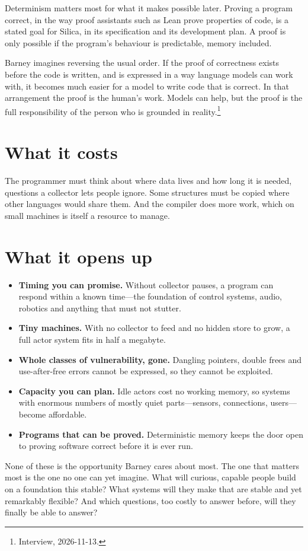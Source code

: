 Determinism matters most for what it makes possible later. Proving a program
correct, in the way proof assistants such as Lean prove properties of code, is
a stated goal for Silica, in its specification and its development plan. A
proof is only possible if the program's behaviour is predictable, memory
included.

Barney imagines reversing the usual order. If the proof of correctness exists
before the code is written, and is expressed in a way language models can work
with, it becomes much easier for a model to write code that is correct. In that
arrangement the proof is the human's work. Models can help, but the proof is the
full responsibility of the person who is grounded in
reality.\footnote{Interview, 2026-11-13.}


\section{What it costs}

The programmer must think about where data lives and how long it is needed,
questions a collector lets people ignore. Some structures must be copied where
other languages would share them. And the compiler does more work, which on
small machines is itself a resource to manage.

\section{What it opens up}

\begin{itemize}
  \item \textbf{Timing you can promise.} Without collector pauses, a program
        can respond within a known time---the foundation of control systems,
        audio, robotics and anything that must not stutter.
  \item \textbf{Tiny machines.} With no collector to feed and no hidden store
        to grow, a full actor system fits in half a megabyte.
  \item \textbf{Whole classes of vulnerability, gone.} Dangling pointers,
        double frees and use-after-free errors cannot be expressed, so they
        cannot be exploited.
  \item \textbf{Capacity you can plan.} Idle actors cost no working memory,
        so systems with enormous numbers of mostly quiet parts---sensors,
        connections, users---become affordable.
  \item \textbf{Programs that can be proved.} Deterministic memory keeps
        the door open to proving software correct before it is ever run.
\end{itemize}

None of these is the opportunity Barney cares about most. The one that matters
most is the one no one can yet imagine. What will curious, capable people build
on a foundation this stable? What systems will they make that are stable and
yet remarkably flexible? And which questions, too costly to answer before, will
they finally be able to answer?

